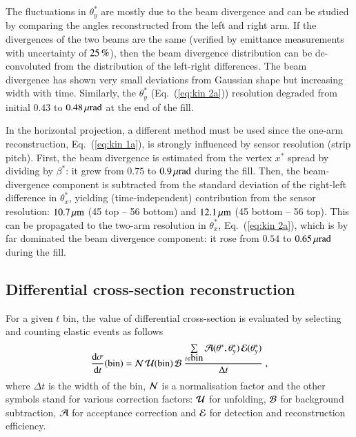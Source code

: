 The fluctuations in $\theta_y^*$ are mostly due to the beam divergence and can be studied by comparing the angles reconstructed from the left and right arm. If the divergences of the two beams are the same (verified by emittance measurements with uncertainty of $25\,{\rm \%}$), then the beam divergence distribution can be de-convoluted from the distribution of the left-right differences. The beam divergence has shown very small deviations from Gaussian shape but increasing width with time. Similarly, the $\theta_y^*$ (Eq.~(\ref{eq:kin 2a})) resolution degraded from initial $0.43$ to $0.48\,{\rm \mu rad}$ at the end of the fill.

In the horizontal projection, a different method must be used since the one-arm reconstruction, Eq.~(\ref{eq:kin 1a}), is strongly influenced by sensor resolution (strip pitch). First, the beam divergence is estimated from the vertex $x^*$ spread by dividing by $\beta^*$: it grew from $0.75$ to $0.9\,{\rm \mu rad}$ during the fill. Then, the beam-divergence component is subtracted from the standard deviation of the right-left difference in $\theta_x^*$, yielding (time-independent) contribution from the sensor resolution: $10.7\,{\rm \mu m}$ (45 top -- 56 bottom) and $12.1\,{\rm \mu m}$ (45 bottom -- 56 top). This can be propagated to the two-arm resolution in $\theta_x^*$, Eq.~({\ref{eq:kin 2a}}), which is by far dominated the beam divergence component: it rose from $0.54$ to $0.65\,{\rm \mu rad}$ during the fill. 


\subsection{Differential cross-section reconstruction}

For a given $t$ bin, the value of differential cross-section is evaluated by selecting and counting elastic events as follows
\begin{equation}
{\d\sigma\over \d t}(\hbox{bin}) =
	{\cal N}\, {\cal U}({\rm bin})\, {\cal B}\ 
	{\sum\limits_{t \in \hbox{bin}} {\cal A}(\theta^*, \theta_y^*)\, {\cal E}(\theta_y^*)\over \Delta t}\ ,
\end{equation}
where $\Delta t$ is the width of the bin, ${\cal N}$ is a normalisation factor and the other symbols stand for various correction factors:
 ${\cal U}$ for unfolding, ${\cal B}$ for background subtraction, ${\cal A}$ for acceptance correction and ${\cal E}$ for detection and reconstruction efficiency.


